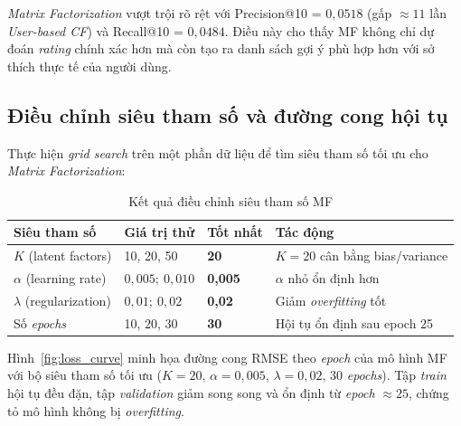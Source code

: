 ﻿\documentclass[../BTL.tex]{subfiles}
\begin{document}
\textit{Matrix Factorization} vượt trội rõ rệt với Precision@10 = $0{,}0518$
(gấp ${\approx}11$ lần \textit{User-based CF}) và Recall@10 = $0{,}0484$.
Điều này cho thấy MF không chỉ dự đoán \textit{rating} chính xác hơn mà
còn tạo ra danh sách gợi ý phù hợp hơn với sở thích thực tế của người dùng.

\subsection{Điều chỉnh siêu tham số và đường cong hội tụ}
\label{section:3.7.3}

Thực hiện \textit{grid search} trên một phần dữ liệu để tìm siêu tham số
tối ưu cho \textit{Matrix Factorization}:

\begin{table}[H]
    \centering
    \caption{Kết quả điều chỉnh siêu tham số MF}
    \label{tab:hyperparam}
    \begin{tabular}{llll}
        \toprule
        \textbf{Siêu tham số} & \textbf{Giá trị thử}
            & \textbf{Tốt nhất} & \textbf{Tác động} \\
        \midrule
        $K$ (latent factors)  & 10, 20, 50       & \textbf{20}
            & $K=20$ cân bằng bias/variance \\
        $\alpha$ (learning rate) & $0{,}005;\ 0{,}010$ & \textbf{0,005}
            & $\alpha$ nhỏ ổn định hơn \\
        $\lambda$ (regularization) & $0{,}01;\ 0{,}02$ & \textbf{0,02}
            & Giảm \textit{overfitting} tốt \\
        Số \textit{epochs}    & 10, 20, 30       & \textbf{30}
            & Hội tụ ổn định sau epoch 25 \\
        \bottomrule
    \end{tabular}
\end{table}

Hình~\ref{fig:loss_curve} minh họa đường cong RMSE theo \textit{epoch} của
mô hình MF với bộ siêu tham số tối ưu ($K=20$, $\alpha=0{,}005$,
$\lambda=0{,}02$, $30$ \textit{epochs}). Tập \textit{train} hội tụ đều đặn,
tập \textit{validation} giảm song song và ổn định từ \textit{epoch} ${\approx}25$,
chứng tỏ mô hình không bị \textit{overfitting}.
\end{document}
